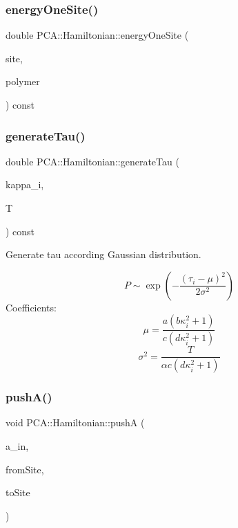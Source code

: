 \hypertarget{class_p_c_a_1_1_hamiltonian_aaf2a99fc482ccd2ebb0dc671f1a8df5a}{}\label{class_p_c_a_1_1_hamiltonian_aaf2a99fc482ccd2ebb0dc671f1a8df5a} 
\subsubsection{\texorpdfstring{energy\+One\+Site()}{energyOneSite()}}
{\footnotesize\ttfamily double P\+C\+A\+::\+Hamiltonian\+::energy\+One\+Site (\begin{DoxyParamCaption}\item[{int}]{site,  }\item[{const \hyperlink{class_p_c_a_1_1_polymer_m_c}{Polymer\+MC} \&}]{polymer }\end{DoxyParamCaption}) const}

\hypertarget{class_p_c_a_1_1_hamiltonian_ad940f8b79c95c45ba11fe21f9491240b}{}\label{class_p_c_a_1_1_hamiltonian_ad940f8b79c95c45ba11fe21f9491240b} 
\subsubsection{\texorpdfstring{generate\+Tau()}{generateTau()}}
{\footnotesize\ttfamily double P\+C\+A\+::\+Hamiltonian\+::generate\+Tau (\begin{DoxyParamCaption}\item[{double}]{kappa\+\_\+i,  }\item[{double}]{T }\end{DoxyParamCaption}) const}



Generate tau according Gaussian distribution. 

\[P\sim \exp\left(-\frac{(\tau_i-\mu)^2}{2\sigma^2}\right)\] Coefficients\+: \[\mu=\frac{a(b\kappa_i^2+1)}{c(d\kappa_i^2+1)}\] \[\sigma^2=\frac{T}{\alpha c(d\kappa_i^2+1)}\] \hypertarget{class_p_c_a_1_1_hamiltonian_aacf57a40855dbf2e27f598b0af2fcba3}{}\label{class_p_c_a_1_1_hamiltonian_aacf57a40855dbf2e27f598b0af2fcba3} 
\subsubsection{\texorpdfstring{push\+A()}{pushA()}}
{\footnotesize\ttfamily void P\+C\+A\+::\+Hamiltonian\+::pushA (\begin{DoxyParamCaption}\item[{double}]{a\+\_\+in,  }\item[{int}]{from\+Site,  }\item[{int}]{to\+Site }\end{DoxyParamCaption})}

